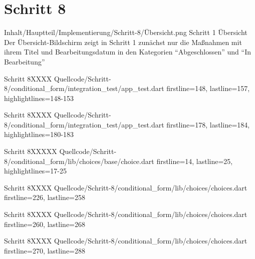 \ifIncludeFigures \clearpage \fi 

\section{Schritt 8}

\begin{alexfigure}{Inhalt/Hauptteil/Implementierung/Schritt-8/Übersicht.png}
  {Schritt 1 Übersicht}
  {Der Übersicht-Bildschirm zeigt in  Schritt 1 zunächst nur die Maßnahmen mit ihrem Titel und Bearbeitungsdatum in den Kategorien \enquote{Abgeschlossen} und \enquote{In Bearbeitung}}

  \label{fig:Schritt1Uebersicht}

\end{alexfigure}

\ifIncludeFigures \clearpage \fi 


\begin{alexlisting}{Schritt 8}{XXXX}
    {Quellcode/Schritt-8/conditional_form/integration_test/app_test.dart}
    {firstline=148, lastline=157, highlightlines={148-153}}
    \label{lst:Schritt8XXXX}
  \end{alexlisting}

  \begin{alexlisting}{Schritt 8}{XXXX}
    {Quellcode/Schritt-8/conditional_form/integration_test/app_test.dart}
    {firstline=178, lastline=184, highlightlines={180-183}}
    \label{lst:Schritt8XXXX}
  \end{alexlisting}


  \begin{alexlisting}{Schritt 8}{XXXXX}
    {Quellcode/Schritt-8/conditional_form/lib/choices/base/choice.dart}
    {firstline=14, lastline=25, highlightlines={17-25}}
    \label{lst:Schritt4XXXXX}
  \end{alexlisting}

  \begin{alexlisting}{Schritt 8}{XXXX}
    {Quellcode/Schritt-8/conditional_form/lib/choices/choices.dart}
    {firstline=226, lastline=258}
    \label{lst:Schritt8XXXX}
  \end{alexlisting}

  \begin{alexlisting}{Schritt 8}{XXXX}
    {Quellcode/Schritt-8/conditional_form/lib/choices/choices.dart}
    {firstline=260, lastline=268}
    \label{lst:Schritt8XXXX}
  \end{alexlisting}

  \begin{alexlisting}{Schritt 8}{XXXX}
    {Quellcode/Schritt-8/conditional_form/lib/choices/choices.dart}
    {firstline=270, lastline=288}
    \label{lst:Schritt8XXXX}
  \end{alexlisting}

